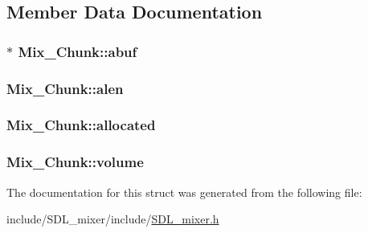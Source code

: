 \subsection{Member Data Documentation}
\hypertarget{struct_mix___chunk_a30b3b1a72677d076a1caa72422bb3774}{
\subsubsection[{abuf}]{$\ast$ Mix\-\_\-\-Chunk\-::abuf}}\label{struct_mix___chunk_a30b3b1a72677d076a1caa72422bb3774}
\hypertarget{struct_mix___chunk_a958507964471fc4b9fa0d215f1852d05}{
\subsubsection[{alen}]{ Mix\-\_\-\-Chunk\-::alen}}\label{struct_mix___chunk_a958507964471fc4b9fa0d215f1852d05}
\hypertarget{struct_mix___chunk_a7b985b90b5f97fffe34834116a281615}{
\subsubsection[{allocated}]{ Mix\-\_\-\-Chunk\-::allocated}}\label{struct_mix___chunk_a7b985b90b5f97fffe34834116a281615}
\hypertarget{struct_mix___chunk_afc566fd5da7f0ed1f3577f5bc0eac319}{
\subsubsection[{volume}]{ Mix\-\_\-\-Chunk\-::volume}}\label{struct_mix___chunk_afc566fd5da7f0ed1f3577f5bc0eac319}


The documentation for this struct was generated from the following file\-:\begin{DoxyCompactItemize}
\item 
include/\-S\-D\-L\-\_\-mixer/include/\hyperlink{_s_d_l__mixer_8h}{S\-D\-L\-\_\-mixer.\-h}\end{DoxyCompactItemize}
